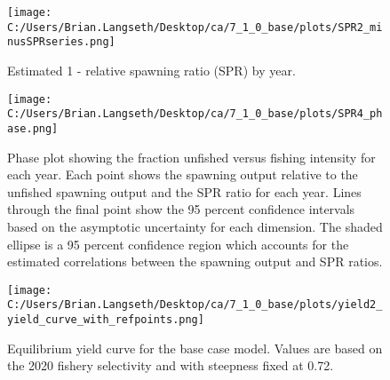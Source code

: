 \documentclass[11pt,
  english,
  letterpaper,
]{article}
\begin{document}

\begin{figure}
\centering
\texttt{[image: C:/Users/Brian.Langseth/Desktop/ca/7\_1\_0\_base/plots/SPR2\_minusSPRseries.png]}
\caption{Estimated 1 - relative spawning ratio (SPR) by year.\label{fig:1-spr}}
\end{figure}

\tagmcend\tagstructend


\begin{figure}
\centering
\texttt{[image: C:/Users/Brian.Langseth/Desktop/ca/7\_1\_0\_base/plots/SPR4\_phase.png]}
\caption{Phase plot showing the fraction unfished versus fishing intensity for each year. Each point shows the spawning output relative to the unfished spawning output and the SPR ratio for each year. Lines through the final point show the 95 percent confidence intervals based on the asymptotic uncertainty for each dimension. The shaded ellipse is a 95 percent confidence region which accounts for the estimated correlations between the spawning output and SPR ratios.\label{fig:phase-plot}}
\end{figure}

\tagmcend\tagstructend


\begin{figure}
\centering
\texttt{[image: C:/Users/Brian.Langseth/Desktop/ca/7\_1\_0\_base/plots/yield2\_yield\_curve\_with\_refpoints.png]}
\caption{Equilibrium yield curve for the base case model. Values are based on the 2020 fishery selectivity and with steepness fixed at 0.72.\label{fig:yield}}
\end{figure}

\tagmcend\tagstructend

\newpage

\clearpage
\end{document}
